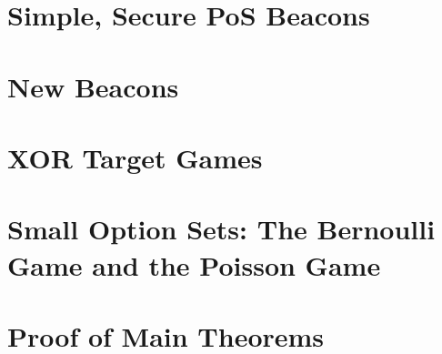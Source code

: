 



\chapter{Simple, Secure PoS Beacons}\label{sec:xorgames-intro}


\chapter{New Beacons}
\label{sec:xorgames-model}

\chapter{XOR Target Games}\label{sec:xor-games}


\chapter{Small Option Sets: The Bernoulli Game and the Poisson Game}\label{app:bernoulli}



\chapter{Proof of Main Theorems}\label{sec:main-thm-proofs}




